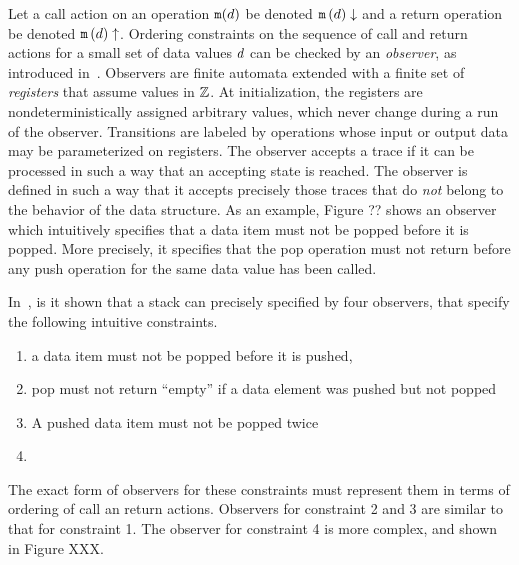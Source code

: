 Let a call action on an operation ${\tt m}(d)$ be denoted
${\tt m}\left(d\right)\downarrow$ and a return operation be denoted
${\tt m}\left(d\right)\uparrow$. Ordering constraints on the sequence of
call and return actions for a small set of data values $d$ can be
checked by an {\em observer},
as introduced in~\cite{AHHR:integrated}. 
%
Observers are
finite automata extended with a finite set of {\em registers}
that assume values in ${\mathbb Z}$. 
%
At initialization,
the registers are nondeterministically
assigned arbitrary values, which never change
during a run of the observer. 
%
Transitions are labeled by 
operations whose input or output data may be parameterized on registers.
%
%
The observer accepts a trace if it can  be processed in such a way that
an accepting state is reached.
%
The observer is defined in such a way that it accepts precisely those
traces that do {\em not} belong to the behavior
of the data structure.
As an example, Figure ?? shows an observer which intuitively specifies that 
a data item must not be popped before it is popped. More precisely, it
specifies that the pop operation must not return before any push operation
for the same data value has been called.



In~\cite{BEEH:icalp15}, is it shown that
a stack can precisely specified by four observers,
that specify the following intuitive constraints.
\begin{enumerate}
\item a data item must not be popped before it is pushed,
\item pop must not return ``empty'' if a data element was pushed but not
  popped
\item A pushed data item must not be popped twice
\item {}
\end{enumerate}
The exact form of observers for these constraints must represent them in
terms of ordering of call an return actions. Observers for constraint
2 and 3 are similar to that for constraint 1. The observer for constraint
4 is more complex, and shown in Figure XXX.


